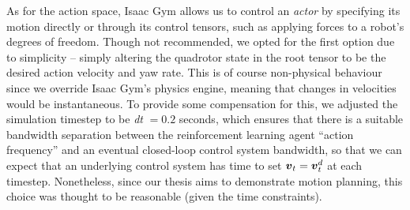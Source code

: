 As for the action space, Isaac Gym allows us to control an \textit{actor} by specifying its motion directly or through its control tensors, such as applying forces to a robot's degrees of freedom. Though not recommended, we opted for the first option due to simplicity -- simply altering the quadrotor state in the root tensor to be the desired action velocity and yaw rate. This is of course non-physical behaviour since we override Isaac Gym's physics engine, meaning that changes in velocities would be instantaneous. 
To provide some compensation for this, we adjusted the simulation timestep to be \textit{dt} $= 0.2$ seconds, which ensures that there is a suitable bandwidth separation between the reinforcement learning agent “action frequency” and an eventual closed-loop control system bandwidth, so that we can expect that an underlying control system has time to set ${\boldsymbol{v}}_t = {\boldsymbol{v}}_t^d$ at each timestep. Nonetheless, since our thesis aims to demonstrate motion planning, this choice was thought to be reasonable (given the time constraints).

